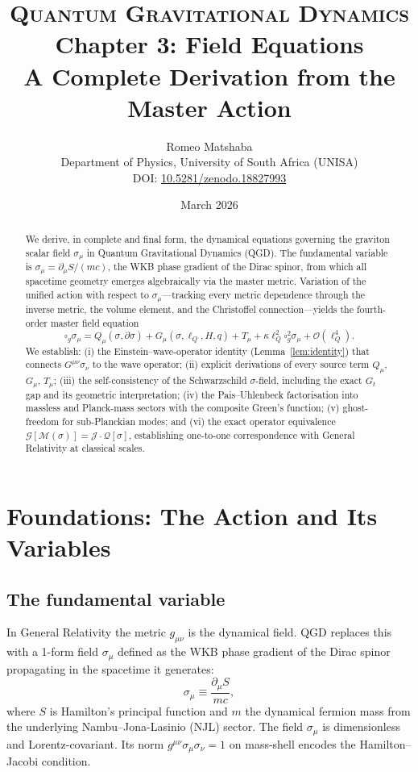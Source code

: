 \documentclass[11pt,a4paper]{article}
\title{%
  \vspace{-1.2cm}
  {\large\scshape Quantum Gravitational Dynamics}\\[6pt]
  {\LARGE\bfseries Chapter 3: Field Equations}\\[8pt]
  {\normalsize A Complete Derivation from the Master Action}
}
\author{%
  Romeo Matshaba\\[4pt]
  \normalsize Department of Physics, University of South Africa (UNISA)\\[2pt]
  \small DOI: \href{https://doi.org/10.5281/zenodo.18827993}{10.5281/zenodo.18827993}
}
\date{March 2026}
\theoremstyle{plain}
\theoremstyle{definition}
\theoremstyle{remark}
\newcommand{\lQ}{\ell_Q}
\newcommand{\boxg}{\square_g}
\begin{document}
\maketitle
\thispagestyle{empty}

\begin{abstract}
\noindent
We derive, in complete and final form, the dynamical equations governing the graviton
scalar field $\sigma_\mu$ in Quantum Gravitational Dynamics (QGD).
The fundamental variable is $\sigma_\mu = \partial_\mu S/(mc)$, the WKB phase gradient
of the Dirac spinor, from which all spacetime geometry emerges algebraically via the
master metric.  Variation of the unified action with respect to $\sigma_\mu$---tracking
every metric dependence through the inverse metric, the volume element, and the
Christoffel connection---yields the fourth-order master field equation
\[
  \boxg\sigma_\mu = Q_\mu(\sigma,\partial\sigma) + G_\mu(\sigma,\lQ,H,q)
                  + T_\mu + \kappa\lQ^2\boxg^2\sigma_\mu + \mathcal{O}(\lQ^4).
\]
We establish: (i) the Einstein--wave-operator identity (Lemma~\ref{lem:identity})
that connects $G^{\mu\nu}\sigma_\nu$ to the wave operator; (ii) explicit derivations
of every source term $Q_\mu$, $G_\mu$, $T_\mu$; (iii) the self-consistency of the
Schwarzschild $\sigma$-field, including the exact $G_t$ gap and its geometric
interpretation; (iv) the Pais--Uhlenbeck factorisation into massless and Planck-mass
sectors with the composite Green's function; (v) ghost-freedom for sub-Planckian modes;
and (vi) the exact operator equivalence $\mathcal{G}[\mathcal{M}(\sigma)]
= \mathcal{J}\cdot\mathcal{Q}[\sigma]$, establishing one-to-one correspondence
with General Relativity at classical scales.
\end{abstract}

\tableofcontents
\newpage

\section{Foundations: The Action and Its Variables}
\label{sec:foundations}

\subsection{The fundamental variable}

In General Relativity the metric $g_{\mu\nu}$ is the dynamical field.  QGD replaces
this with a 1-form field $\sigma_\mu$ defined as the WKB phase gradient of the Dirac
spinor propagating in the spacetime it generates:
\begin{equation}
  \sigma_\mu \equiv \frac{\partial_\mu S}{mc},
  \label{eq:sigma_def}
\end{equation}
where $S$ is Hamilton's principal function and $m$ the dynamical fermion mass from the
underlying Nambu--Jona-Lasinio (NJL) sector.  The field $\sigma_\mu$ is dimensionless
and Lorentz-covariant.  Its norm $g^{\mu\nu}\sigma_\mu\sigma_\nu = 1$ on mass-shell
encodes the Hamilton--Jacobi condition.
\end{document}
